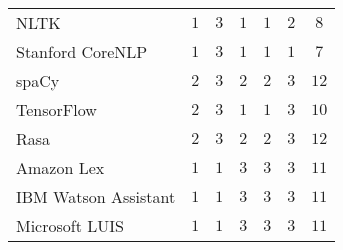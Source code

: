 \begin{tabular}{l*6{|c}}
%
\toprule
%
&&&&&&\\
%
\midrule
NLTK&$1$&$3$&$1$&$1$&$2$&$8$\\
%
Stanford CoreNLP&$1$&$3$&$1$&$1$&$1$&$7$\\
%
spaCy&$2$&$3$&$2$&$2$&$3$&$12$\\
%
TensorFlow&$2$&$3$&$1$&$1$&$3$&$10$\\
%
Rasa&$2$&$3$&$2$&$2$&$3$&$12$\\
%
Amazon Lex&$1$&$1$&$3$&$3$&$3$&$11$\\
%
IBM Watson Assistant&$1$&$1$&$3$&$3$&$3$&$11$\\
%
Microsoft LUIS&$1$&$1$&$3$&$3$&$3$&$11$\\
\bottomrule
\end{tabular}
